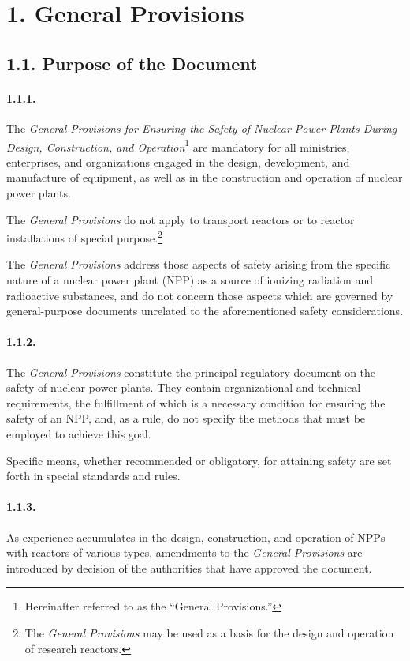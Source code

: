 \documentclass[openright]{bookest}
\begin{document}
\section*{1. General Provisions}
\subsection*{1.1. Purpose of the Document}

\paragraph{1.1.1.}
The \textit{General Provisions for Ensuring the Safety of Nuclear Power Plants During Design, Construction, and Operation}\footnote{Hereinafter referred to as the ``General Provisions.''} are mandatory for all ministries, enterprises, and organizations engaged in the design, development, and manufacture of equipment, as well as in the construction and operation of nuclear power plants.

The \textit{General Provisions} do not apply to transport reactors or to reactor installations of special purpose.\footnote{The \textit{General Provisions} may be used as a basis for the design and operation of research reactors.}

The \textit{General Provisions} address those aspects of safety arising from the specific nature of a nuclear power plant (NPP) as a source of ionizing radiation and radioactive substances, and do not concern those aspects which are governed by general-purpose documents unrelated to the aforementioned safety considerations.

\paragraph{1.1.2.}
The \textit{General Provisions} constitute the principal regulatory document on the safety of nuclear power plants. They contain organizational and technical requirements, the fulfillment of which is a necessary condition for ensuring the safety of an NPP, and, as a rule, do not specify the methods that must be employed to achieve this goal.

Specific means, whether recommended or obligatory, for attaining safety are set forth in special standards and rules.

\paragraph{1.1.3.}
As experience accumulates in the design, construction, and operation of NPPs with reactors of various types, amendments to the \textit{General Provisions} are introduced by decision of the authorities that have approved the document.
\end{document}
